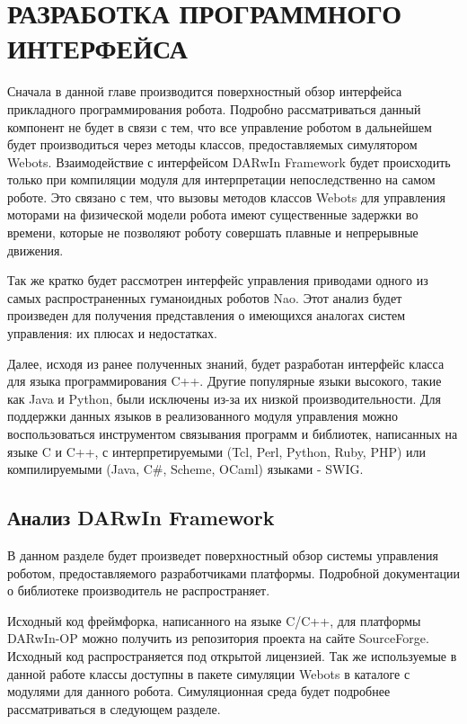 \chapter{РАЗРАБОТКА ПРОГРАММНОГО ИНТЕРФЕЙСА}

Сначала в данной главе производится поверхностный обзор интерфейса прикладного программирования робота. Подробно рассматриваться данный компонент не будет в связи с тем, что все управление роботом в дальнейшем будет производиться через методы классов, предоставляемых симулятором Webots. Взаимодействие с интерфейсом DARwIn Framework будет происходить только при компиляции модуля для интерпретации непоследственно на самом роботе. Это связано с тем, что вызовы методов классов Webots для управления моторами на физической модели робота имеют существенные задержки во времени, которые не позволяют роботу совершать плавные и непрерывные движения.

Так же кратко будет рассмотрен интерфейс управления приводами одного из самых распространенных гуманоидных роботов Nao. Этот анализ будет произведен для получения представления о имеющихся аналогах систем управления: их плюсах и недостатках.

Далее, исходя из ранее полученных знаний, будет разработан интерфейс класса для языка программирования C++. Другие популярные языки высокого, такие как Java и Python, были исключены из-за их низкой производительности. Для поддержки данных языков в реализованного модуля управления можно воспользоваться инструментом связывания программ и библиотек, написанных на языке C и C++, с интерпретируемыми (Tcl, Perl, Python, Ruby, PHP) или компилируемыми (Java, C\#, Scheme, OCaml) языками - SWIG.


\section{Анализ DARwIn Framework}

В данном разделе будет произведет поверхностный обзор системы управления роботом, предоставляемого разработчиками платформы. Подробной документации о библиотеке производитель не распространяет.

Исходный код фреймфорка, написанного на языке C/C++, для платформы DARwIn-OP можно получить из репозитория проекта на сайте SourceForge. Исходный код распространяется под открытой лицензией. Так же используемые в данной работе классы доступны в пакете симуляции Webots в каталоге с модулями для данного робота. Симуляционная среда будет подробнее рассматриваться в следующем разделе.

